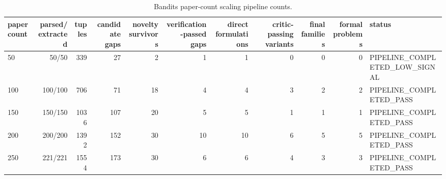 \begin{table}[htbp]
\centering
\caption{Bandits paper-count scaling pipeline counts.}
\label{tab:paper\_scaling\_counts}
\begin{tabular}{lrrrrrrrrrl}
\toprule
paper count & parsed/extracted & tuples & candidate gaps & novelty survivors & verification-passed gaps & direct formulations & critic-passing variants & final families & formal problems & status \\
\midrule
50 & 50/50 & 339 & 27 & 2 & 1 & 1 & 0 & 0 & 0 & PIPELINE\_COMPLETED\_LOW\_SIGNAL \\
100 & 100/100 & 706 & 71 & 18 & 4 & 4 & 3 & 2 & 2 & PIPELINE\_COMPLETED\_PASS \\
150 & 150/150 & 1036 & 107 & 20 & 5 & 5 & 1 & 1 & 1 & PIPELINE\_COMPLETED\_PASS \\
200 & 200/200 & 1392 & 152 & 30 & 10 & 10 & 6 & 5 & 5 & PIPELINE\_COMPLETED\_PASS \\
250 & 221/221 & 1554 & 173 & 30 & 6 & 6 & 4 & 3 & 3 & PIPELINE\_COMPLETED\_PASS \\
\bottomrule
\end{tabular}
\end{table}
